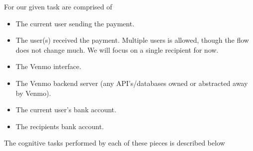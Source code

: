 For our given task  are comprised of

\begin{itemize}
\item
  The current user sending the payment.
\item
  The user(s) received the payment. Multiple users is allowed, though the flow does not change much. We will focus on a single recipient for now.
\item
  The Venmo interface.
\item
  The Venmo backend server (any API's/databases owned or abstracted away by Venmo).
\item
  The current user's bank account.
\item
  The recipients bank account.
\end{itemize}

The cognitive tasks performed by each of these pieces is described below

